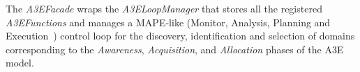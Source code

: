 
The \textit{A3EFacade} wraps the \textit{A3ELoopManager} that stores all the registered \textit{A3EFunctions} and manages a MAPE-like (Monitor, Analysis, Planning and Execution~\cite{kephart2003vision}) control loop for the discovery, identification and selection of domains corresponding to the \textit{Awareness}, \textit{Acquisition}, and \textit{Allocation} phases of the A3E model. %

